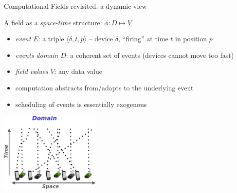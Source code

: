 \documentclass[presentation, 9pt]{beamer}\mode<presentation>{\usetheme{AMSBolognaFC}}
\begin{document}
\begin{frame}{Computational Fields revisited: a dynamic view}
\begin{alertblock}{A field as a \textit{space-time} structure: $\phi:D\mapsto V$}
\begin{itemize}
		\item {\it event} $E$: a triple $\langle \delta, t, p\rangle$ -- device $\delta$, ``firing'' at time $t$ in position $p$
		\item {\it events domain} $D$: a coherent set of events (devices cannot move too fast)
		\item {\it field values} $V$: any data value
		\item[\faArrowRight] computation abstracts from/adapts to the underlying event
		\item[\faArrowRight] scheduling of events is essentially exogenous
\end{itemize}
\end{alertblock}
\begin{center}
\includegraphics[height=4cm]{img/spacetime1.pdf}~~~~~~~~~~
\end{center}
\end{frame}
\end{document}

